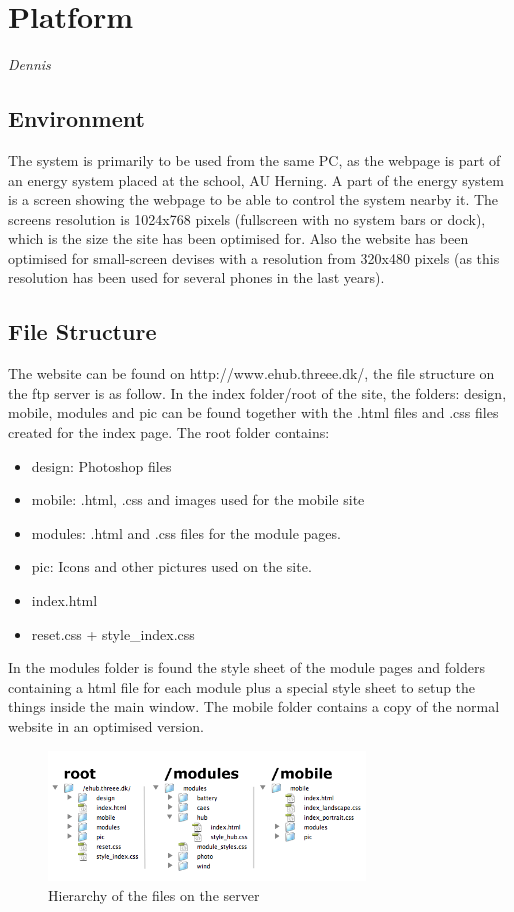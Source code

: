 \newpage
\chapter{Platform} \textit{Dennis}
\section{Environment}
The system is primarily to be used from the same PC, as the webpage is part of an energy system
placed at the school, AU Herning. A part of the energy system is a screen showing the webpage to
be able to control the system nearby it. The screens resolution is 1024x768 pixels (fullscreen with no system bars or dock), 
which is the size the site has been optimised for. Also the website has been optimised for small-screen devises with a resolution from 320x480 pixels (as this resolution has been used for several phones in the last years).
\section{File Structure}
The website can be found on http://www.ehub.threee.dk/, the file structure on the ftp server is as follow. In the index folder/root of the site, the folders: design, mobile, modules and pic can be found together with the .html files and .css files created for the index page. The root folder contains:
\begin{itemize}
	\item design: Photoshop files
	\item mobile: .html, .css and images used for the mobile site
	\item modules: .html and .css files for the module pages.
	\item pic: Icons and other pictures used on the site.	
	\item index.html
	\item reset.css + style\_index.css
\end{itemize}
In the modules folder is found the style sheet of the module pages and folders containing a html file for each module plus a special style sheet to setup the things inside the main window. The mobile folder contains a copy of the normal website in an optimised version.

\begin{figure}[htbp]
	\center
	\includegraphics[width=0.75\textwidth]{images/hierarki.png} %
   	\caption{Hierarchy of the files on the server}
   	\label{fig:file_hierarki}
\end{figure}
\newpage
